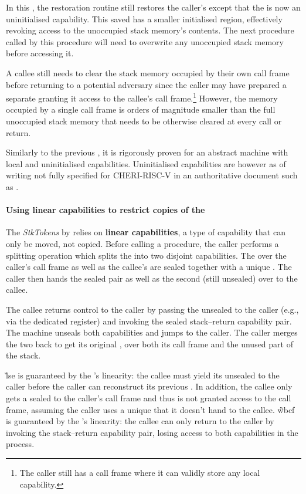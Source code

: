 \documentclass[main.tex]{subfiles}
\begin{document}
In this , the restoration routine still restores the caller's  except that the  is now an uninitialised capability. This saved  has a smaller initialised region, effectively revoking access to the unoccupied stack memory's contents. The next procedure called by this procedure will need to overwrite any unoccupied stack memory before accessing it.

A callee still needs to clear the stack memory occupied by their own call frame before returning to a potential adversary since the caller may have prepared a separate  granting it access to the callee's call frame.\footnote{The caller still has a call frame where it can validly store any local capability.} However, the memory occupied by a single call frame is orders of magnitude smaller than the full unoccupied stack memory that needs to be otherwise cleared at every call or return.

Similarly to the previous , it is rigorously proven for an abstract machine with local and uninitialised capabilities. Uninitialised capabilities are however as of writing not fully specified for CHERI-RISC-V in an authoritative document such as \cite{cheri}.

\paragraph{Using linear capabilities to restrict copies of the } The \emph{StkTokens}  by \cite{stktokens} relies on \textbf{linear capabilities}, a type of capability that can only be moved, not copied. Before calling a procedure, the caller performs a splitting operation which splits the  into two disjoint capabilities. The  over the caller's call frame as well as the callee's  are sealed together with a unique . The caller then hands the sealed pair as well as the second (still unsealed)  over to the callee.

The callee returns control to the caller by passing the unsealed  to the caller (e.g., via the dedicated  register) and invoking the sealed stack–return capability pair. The machine unseals both capabilities and jumps to the caller. The caller merges the two  back to get its original , over both its call frame and the unused part of the stack.

\G{lse} is guaranteed by the 's linearity: the callee must yield its unsealed  to the caller before the caller can reconstruct its previous . In addition, the callee only gets a sealed  to the caller's call frame and thus is not granted access to the call frame, assuming the caller uses a unique  that it doesn't hand to the callee. \G{wbcf} is guaranteed by the 's linearity: the callee can only return to the caller by invoking the stack–return capability pair, losing access to both capabilities in the process.
\end{document}
